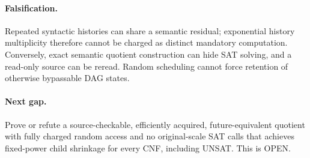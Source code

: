 \documentclass{article}
\begin{document}
\paragraph{Falsification.} Repeated syntactic histories can share a semantic residual; exponential history multiplicity therefore cannot be charged as distinct mandatory computation. Conversely, exact semantic quotient construction can hide SAT solving, and a read-only source can be reread. Random scheduling cannot force retention of otherwise bypassable DAG states.
\paragraph{Next gap.} Prove or refute a source-checkable, efficiently acquired, future-equivalent quotient with fully charged random access and no original-scale SAT calls that achieves fixed-power child shrinkage for every CNF, including UNSAT. This is OPEN.
\end{document}
